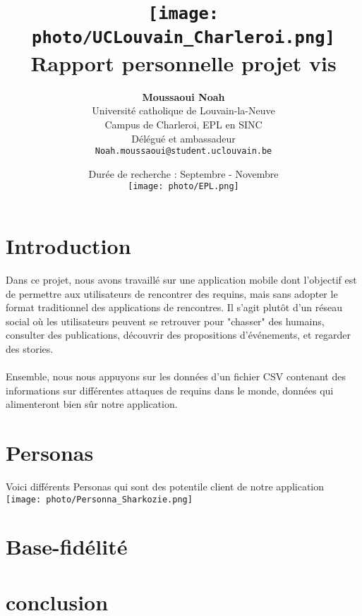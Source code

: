 \documentclass{article}
\title{
    \texttt{[image: photo/UCLouvain\_Charleroi.png]} \\
    \vspace{1.5cm}
    {\Huge \textbf{Rapport personnelle projet vis}} \\
    \vspace{1.5cm}
}
\author{
    \textbf{Moussaoui Noah} \\
    Université catholique de Louvain-la-Neuve \\
    Campus de Charleroi, EPL en SINC \\
    Délégué et ambassadeur \\
    \texttt{Noah.moussaoui@student.uclouvain.be}
}
\date{
    \vspace{1.5cm}
    Durée de recherche : Septembre - Novembre \\
     \vspace{1.5cm}
    \texttt{[image: photo/EPL.png]}
}
\begin{document}
\maketitle
\newpage
\section{Introduction}
Dans ce projet, nous avons travaillé sur une application mobile dont l'objectif est de permettre 
aux utilisateurs de rencontrer des requins, mais sans adopter le format traditionnel des applications
de rencontres. Il s'agit plutôt d'un réseau social où les utilisateurs peuvent se retrouver pour 
"chasser" des humains, consulter des publications, découvrir des propositions d’événements, 
et regarder des stories.\\\\

Ensemble, nous nous appuyons sur les données d’un fichier CSV contenant des informations 
sur différentes attaques de requins dans le monde, données qui alimenteront bien sûr notre application.


\section{Personas}
Voici différents Personas qui sont des potentile client de notre application \\

\texttt{[image: photo/Personna\_Sharkozie.png]}




\section{Base-fidélité}


\section{conclusion}
\end{document}
